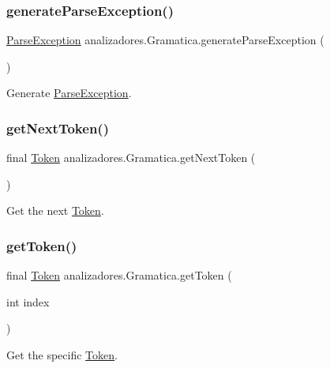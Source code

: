 \subsubsection{\texorpdfstring{generate\+Parse\+Exception()}{generateParseException()}}
{\footnotesize\ttfamily \mbox{\hyperlink{classanalizadores_1_1_parse_exception}{Parse\+Exception}} analizadores.\+Gramatica.\+generate\+Parse\+Exception (\begin{DoxyParamCaption}{ }\end{DoxyParamCaption})}

Generate \mbox{\hyperlink{classanalizadores_1_1_parse_exception}{Parse\+Exception}}. \mbox{\label{classanalizadores_1_1_gramatica_a9d110e08acaad0a9dafdb60f0bbab867}} 
\subsubsection{\texorpdfstring{get\+Next\+Token()}{getNextToken()}}
{\footnotesize\ttfamily final \mbox{\hyperlink{classanalizadores_1_1_token}{Token}} analizadores.\+Gramatica.\+get\+Next\+Token (\begin{DoxyParamCaption}{ }\end{DoxyParamCaption})}

Get the next \mbox{\hyperlink{classanalizadores_1_1_token}{Token}}. \mbox{\label{classanalizadores_1_1_gramatica_a58bb5ec9c1d432a2cc6194d6d829be8e}} 
\subsubsection{\texorpdfstring{get\+Token()}{getToken()}}
{\footnotesize\ttfamily final \mbox{\hyperlink{classanalizadores_1_1_token}{Token}} analizadores.\+Gramatica.\+get\+Token (\begin{DoxyParamCaption}\item[{int}]{index }\end{DoxyParamCaption})}

Get the specific \mbox{\hyperlink{classanalizadores_1_1_token}{Token}}. \mbox{\label{classanalizadores_1_1_gramatica_a9e84c347a44af8ef31e238a877e52eda}} 
